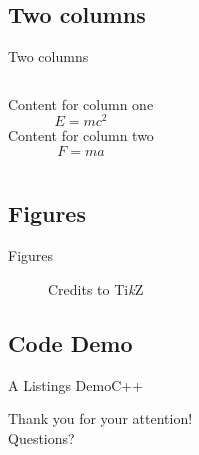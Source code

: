 \documentclass[
10pt,
aspectratio=169,
]{beamer}
\begin{document}
\subsection{Two columns}
\begin{frame}[c]{Two columns}
	
\begin{columns}[onlytextwidth]
	Content for column one
	\begin{equation}
	E = mc^2
	\end{equation}
	Content for column two
	\begin{equation}
	F=ma
	\end{equation}
\end{columns}
	
\end{frame}	

\subsection{Figures}
\begin{frame}[c]{Figures}
	\begin{figure}
		\centering
		\caption{Credits to Ti\textit{k}Z}
	\end{figure}
\end{frame}	
\subsection{Code Demo}
\begin{frame}{A Listings Demo}{C++}
	\lstI
\end{frame}
\begin{frame}[plain]
	\vfill
	\centering
	{
		\centering \Huge \color{white} Thank you for your attention!\\[10pt]Questions?
	}
	\vfill
\end{frame}
\end{document}
